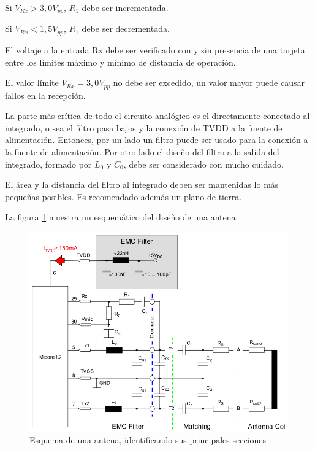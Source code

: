 \bigskip
Si $V_{Rx} > 3,0V_{pp}$,  $R_{1}$ debe ser incrementada.

\bigskip
Si $V_{Rx} < 1,5V_{pp}$,  $R_{1}$ debe ser decrementada.

\bigskip
El voltaje a la entrada Rx debe ser verificado con y sin presencia de una tarjeta entre los límites máximo y mínimo de distancia de operación.

\bigskip
\begin{itshape}
El valor límite  $V_{Rx}= 3,0V_{pp}$ no debe ser excedido, un valor mayor puede causar fallos en la recepción.
\end{itshape}

\bigskip
\bigskip
{}

\bigskip
{}

\bigskip
La parte más crítica de todo el circuito analógico es el directamente conectado al integrado, o sea el filtro pasa bajos y la conexión de TVDD a la fuente de alimentación.
Entonces, por un lado un filtro puede ser usado para la conexión a la fuente de alimentación.
Por otro lado el diseño del filtro a la salida del integrado, formado por $L_{0}$ y $C_{0}$, debe ser considerado con mucho cuidado. \begin{itshape} El área y la distancia del filtro al integrado deben ser mantenidas lo más pequeñas posibles. Es recomendado además un plano de tierra.	
\end{itshape}

\bigskip
La figura \ref{Fig:RFID4} muestra un esquemático del diseño de una antena:

\begin{figure}[H]
\centering
  \begin{center}
  \includegraphics[scale=.4]{Imagenes/anexo2.png} 
  \end{center}
  \caption{Esquema de una antena, identificando sus principales secciones}\label{Fig:RFID4} 
\end{figure}


